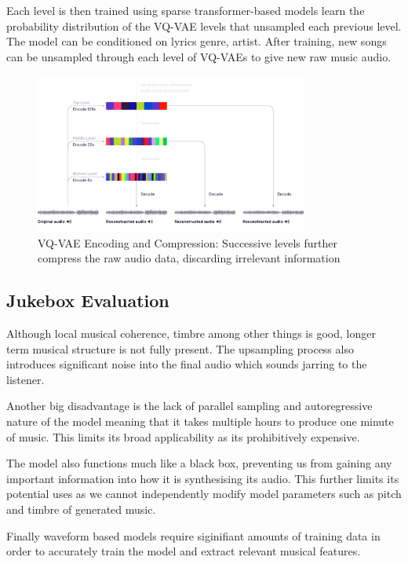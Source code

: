 Each level is then trained using sparse transformer-based models learn the probability distribution of the VQ-VAE levels that unsampled each previous level. The model can be conditioned on lyrics genre, artist. After training, new songs can be unsampled through each level of VQ-VAEs to give new raw music audio.

\begin{figure}
    \centering
    \includegraphics[width=0.8\textwidth]{literature_review/vq-vae.png}
    \caption{VQ-VAE Encoding and Compression: Successive levels further compress the raw audio data, discarding irrelevant information}
    \label{fig:jukebox_example}
\end{figure}

\subsection{Jukebox Evaluation}

Although local musical coherence, timbre among other things is good, longer term musical structure is not fully present. The upsampling process also introduces significant noise into the final audio which sounds jarring to the listener.

Another big disadvantage is the lack of parallel sampling and autoregressive nature of the model meaning that it takes multiple hours to produce one minute of music. This limits its broad applicability as its prohibitively expensive.

The model also functions much like a black box, preventing us from gaining any important information into how it is synthesising its audio. This further limits its potential uses as we cannot independently modify model parameters such as pitch and timbre of generated music.

Finally waveform based models require siginifiant amounts of training data in order to accurately train the model and extract relevant musical features.

